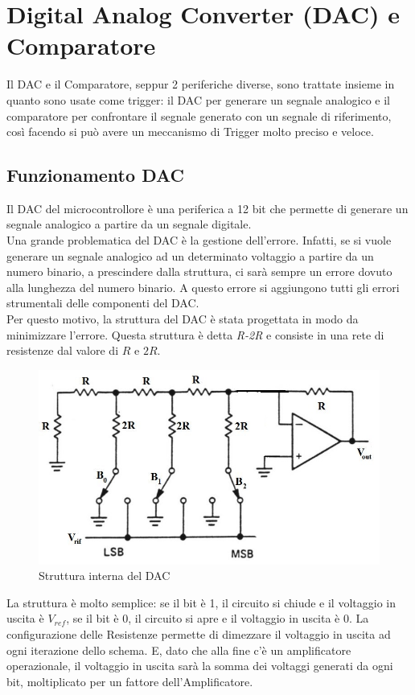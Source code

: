 \pagebreak
\section{Digital Analog Converter (DAC) e Comparatore}
Il DAC e il Comparatore, seppur 2 periferiche diverse, sono trattate insieme in quanto sono usate come trigger: il DAC per generare un segnale analogico e il comparatore per confrontare il segnale generato con un segnale di riferimento, così facendo si può avere un meccanismo di Trigger molto preciso e veloce.\\

\subsection{Funzionamento DAC}

Il DAC del microcontrollore è una periferica a 12 bit che permette di generare un segnale analogico a partire da un segnale digitale.\\ 
Una grande problematica del DAC è la gestione dell'errore. Infatti, se si vuole generare un segnale analogico ad un determinato voltaggio a partire da un numero binario, a prescindere dalla struttura, ci sarà sempre un errore dovuto alla lunghezza del numero binario. A questo errore si aggiungono tutti gli errori strumentali delle componenti del DAC.\\

Per questo motivo, la struttura del DAC è stata progettata in modo da minimizzare l'errore. Questa struttura è detta \textit{R-2R} e consiste in una rete di resistenze dal valore di $R$ e $2R$.

\begin{figure}[h]
    \centering
    \includegraphics[width=0.7\linewidth]{microcontrollore/assets/DACr2r.jpg}
    \caption{Struttura interna del DAC}
    \label{fig:DAC}
\end{figure}

La struttura è molto semplice: se il bit è 1, il circuito si chiude e il voltaggio in uscita è $V_{ref}$, se il bit è 0, il circuito si apre e il voltaggio in uscita è 0. La configurazione delle Resistenze permette di dimezzare il voltaggio in uscita ad ogni iterazione dello schema. E, dato che alla fine c'è un amplificatore operazionale, il voltaggio in uscita sarà la somma dei voltaggi generati da ogni bit, moltiplicato per un fattore dell'Amplificatore.\\


